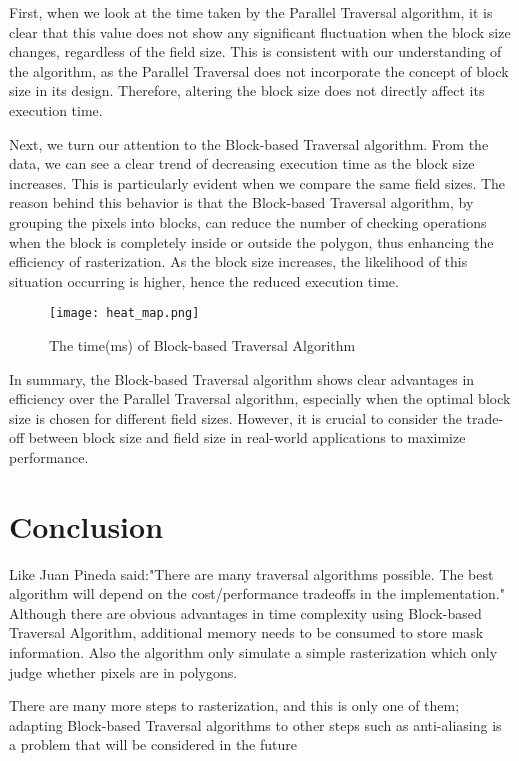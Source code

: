 \documentclass[
	a4paper, %
	10pt, %
	unnumberedsections, %
	twoside, %
]{LTJournalArticle}
\begin{document}
First, when we look at the time taken by the Parallel Traversal algorithm, it is clear that this value does not show any significant fluctuation when the block size changes, regardless of the field size. This is consistent with our understanding of the algorithm, as the Parallel Traversal does not incorporate the concept of block size in its design. Therefore, altering the block size does not directly affect its execution time.

Next, we turn our attention to the Block-based Traversal algorithm. From the data, we can see a clear trend of decreasing execution time as the block size increases. This is particularly evident when we compare the same field sizes. The reason behind this behavior is that the Block-based Traversal algorithm, by grouping the pixels into blocks, can reduce the number of checking operations when the block is completely inside or outside the polygon, thus enhancing the efficiency of rasterization. As the block size increases, the likelihood of this situation occurring is higher, hence the reduced execution time.

\begin{figure}[H] %
	\texttt{[image: heat\_map.png]}
	\caption{The time(ms) of Block-based Traversal Algorithm}
\end{figure}

In summary, the Block-based Traversal algorithm shows clear advantages in efficiency over the Parallel Traversal algorithm, especially when the optimal block size is chosen for different field sizes. However, it is crucial to consider the trade-off between block size and field size in real-world applications to maximize performance.


\section{Conclusion}

Like Juan Pineda said:"There are many traversal algorithms possible. The best algorithm will depend on the cost/performance tradeoffs in the implementation."\cite{pineda1988} Although there are obvious advantages in time complexity using Block-based Traversal Algorithm, additional memory needs to be consumed to store mask information. Also the algorithm only simulate a simple rasterization which only judge whether pixels are in polygons. 

There are many more steps to rasterization, and this is only one of them; adapting Block-based Traversal algorithms to other steps such as anti-aliasing is a problem that will be considered in the future



\printbibliography

\end{document}
